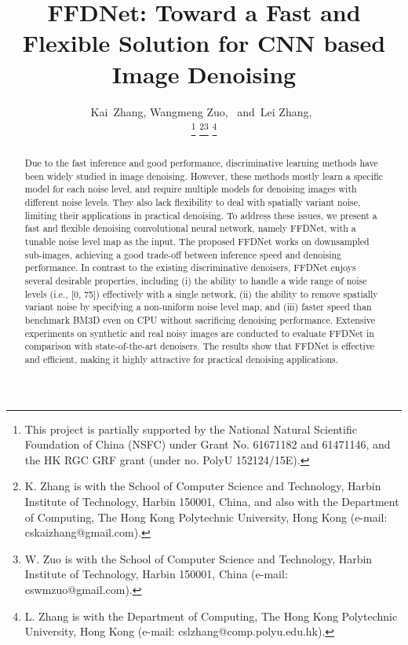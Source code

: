 \documentclass[journal]{IEEEtran}
\begin{document}
\title{FFDNet: Toward a Fast and Flexible Solution for CNN based Image Denoising}

\author{Kai~Zhang,
        Wangmeng Zuo,~
        and~Lei Zhang,~

\thanks{This project is partially supported by the National Natural Scientific Foundation of China (NSFC) under Grant No. 61671182 and 61471146, and the HK RGC GRF grant (under no. PolyU 152124/15E).}
\thanks{K. Zhang is with the School of Computer Science and Technology, Harbin
Institute of Technology, Harbin 150001, China, and also with the Department
of Computing, The Hong Kong Polytechnic University, Hong Kong (e-mail: cskaizhang@gmail.com).}\thanks{W. Zuo is with the School of Computer Science and
Technology, Harbin Institute of Technology, Harbin 150001, China (e-mail:
cswmzuo@gmail.com).}
\thanks{L. Zhang is with the Department of Computing, The Hong Kong
Polytechnic University, Hong Kong (e-mail: cslzhang@comp.polyu.edu.hk).}
}










\maketitle


\begin{abstract}

Due to the fast inference and good performance, discriminative learning methods have been widely studied in image denoising. However, these methods mostly learn a specific model for each noise level, and require multiple models for denoising images with different noise levels. They also lack flexibility to deal with spatially variant noise, limiting their applications in practical denoising. To address these issues, we present a fast and flexible denoising convolutional neural network, namely FFDNet, with a tunable noise level map as the input. The proposed FFDNet works on downsampled sub-images, achieving a good trade-off between inference speed and denoising performance. In contrast to the existing discriminative denoisers, FFDNet enjoys several desirable properties, including (i) the ability to handle a wide range of noise levels (i.e., [0, 75]) effectively with a single network, (ii) the ability to remove spatially variant noise by specifying a non-uniform noise level map, and (iii) faster speed than benchmark BM3D even on CPU without sacrificing denoising performance. Extensive experiments on synthetic and real noisy images are conducted to evaluate FFDNet in comparison with state-of-the-art denoisers. The results show that FFDNet is effective and efficient, making it highly attractive for practical denoising applications.


\end{abstract}
\end{document}
